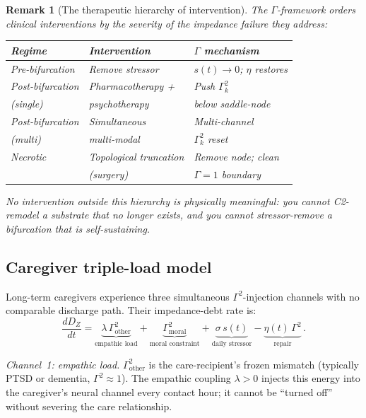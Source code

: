 \documentclass[aps,pre,twocolumn,superscriptaddress,floatfix]{revtex4-2}
\newtheorem{remark}{Remark}
\begin{document}
\begin{remark}[The therapeutic hierarchy of
  intervention]
\label{rem:therapeutic-hierarchy}
The $\Gamma$-framework orders clinical
interventions by the severity of the impedance
failure they address:
\begin{center}
\begin{tabular}{@{}lll@{}}
\toprule
\textbf{Regime} & \textbf{Intervention} &
  \textbf{$\Gamma$ mechanism} \\
\midrule
Pre-bifurcation & Remove stressor &
  $s(t) \to 0$; $\eta$ restores \\
Post-bifurcation & Pharmacotherapy + & Push $\Gamma_k^2$ \\
\quad (single) & \quad psychotherapy & below saddle-node \\
Post-bifurcation & Simultaneous & Multi-channel \\
\quad (multi) & \quad multi-modal & $\Gamma_k^2$ reset \\
Necrotic & Topological truncation &
  Remove node; clean \\
 & \quad (surgery) & $\Gamma{=}1$ boundary \\
\bottomrule
\end{tabular}
\end{center}
No intervention outside this hierarchy is
physically meaningful: you cannot C2-remodel a
substrate that no longer exists, and you cannot
stressor-remove a bifurcation that is
self-sustaining.
\end{remark}


\subsection{Caregiver triple-load model}
\label{sec:triple-load}

Long-term caregivers experience three simultaneous
$\Gamma^2$-injection channels with no comparable
discharge path.  Their impedance-debt rate is:
\begin{equation}
  \frac{dD_Z}{dt}
  = \underbrace{\lambda\,\Gamma_{\text{other}}^2}_{\text{empathic load}}
  + \underbrace{\Gamma_{\text{moral}}^2}_{\text{moral constraint}}
  + \underbrace{\sigma\,s(t)}_{\text{daily stressor}}
  - \underbrace{\eta(t)\,\Gamma^2}_{\text{repair}}\,.
  \label{eq:triple-load}
\end{equation}

\emph{Channel~1: empathic load.}
$\Gamma_{\text{other}}^2$ is the care-recipient's
frozen mismatch (typically PTSD or dementia,
$\Gamma^2\!\approx\!1$).
The empathic coupling $\lambda>0$ injects this
energy into the caregiver's neural channel
every contact hour; it cannot be ``turned off'' without
severing the care relationship.
\end{document}
